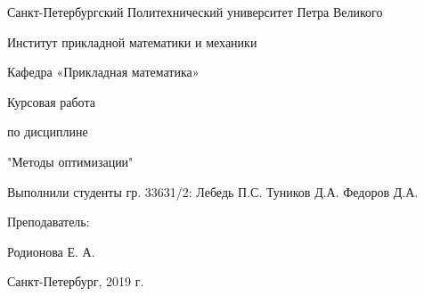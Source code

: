 \begin{titlepage}
  \begin{center}
	Санкт-Петербургский Политехнический университет Петра Великого
     
	Институт прикладной математики и механики
     
    Кафедра «Прикладная математика»
     
     \vfill
	 Курсовая работа
	 
	 по дисциплине
	 
	"Методы оптимизации"    
	
\end{center}
\vfill
 
\begin{minipage}{0.6\textwidth}
Выполнили студенты гр. 33631/2:
\newline Лебедь П.С.
\newline Туников Д.А.
\newline Федоров Д.А.
\end{minipage}

\bigskip
 \begin{minipage}{0.4\textwidth}
Преподаватель:

Родионова Е. А.
\end{minipage}

\vfill
 
\begin{center}
Санкт-Петербург, 2019 г.
\end{center}
\end{titlepage}